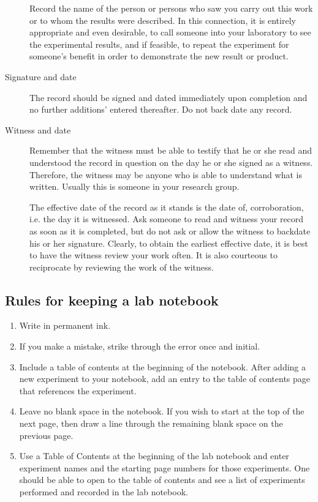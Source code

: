 \begin{description}
Record the name of the person or persons who saw you carry out this work or to whom the results were described.  In this connection, it is entirely appropriate and even desirable, to call someone into your laboratory to see the experimental results, and if feasible, to repeat the experiment for someone's benefit in order to demonstrate the new result or product.

\item[Signature and date]

The record should be signed and dated immediately upon completion and no further additions' entered thereafter. Do not back date any record.

\item[Witness and date]

Remember that the witness must be able to testify that he or she read and understood the record in question on the day he or she signed as a witness. Therefore, the witness may be anyone who is able to understand what is written.  Usually this is someone in your research group.

The effective date of the record as it stands is the date of, corroboration, i.e.  the day it is witnessed. Ask someone to read and witness your record as soon as it is completed, but do not ask or allow the witness to backdate his or her signature.  Clearly, to obtain the earliest effective date, it is best to have the witness review your work often.  It is also courteous to reciprocate by reviewing the work of the witness.
\end{description}

\subsection*{Rules for keeping a lab notebook}

\begin{enumerate}
	\item Write in permanent ink.
	\item If you make a mistake, strike through the error once and initial.
	\item Include a table of contents at the beginning of the notebook. After adding a new experiment to your notebook, add an entry to the table of contents page that references the experiment.
	\item Leave no blank space in the notebook. If you wish to start at the top of the next page, then draw a line through the remaining blank space on the previous page.
	\item Use a Table of Contents at the beginning of the lab notebook and enter experiment names and the starting page numbers for those experiments. One should be able to open to the table of contents and see a list of experiments performed and recorded in the lab notebook.
\end{enumerate}
